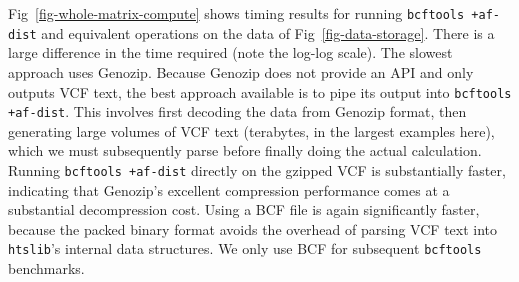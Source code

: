 \documentclass[a4paper,num-refs]{oup-contemporary}
\begin{document}
Fig~\ref{fig-whole-matrix-compute} shows timing results
for running \texttt{bcftools +af-dist} and equivalent operations
on the data of Fig~\ref{fig-data-storage}. There is a large
difference in the time required (note the log-log scale).
The slowest approach uses Genozip. Because Genozip does not
provide an API and only outputs VCF text, the best approach available
is to pipe its output into \texttt{bcftools +af-dist}.
This involves first decoding the data from Genozip format,
then generating large volumes  of VCF text (terabytes, in the
largest examples here), which we must
subsequently parse before finally doing the actual calculation.
Running \texttt{bcftools +af-dist} directly on the gzipped VCF
is substantially faster, indicating that Genozip's excellent
compression performance comes at a substantial decompression cost.
Using a BCF file is again significantly faster,
because the packed binary format avoids the overhead of parsing
VCF text into \texttt{htslib}'s internal data structures.
We only use BCF for subsequent \texttt{bcftools} benchmarks.
\end{document}
